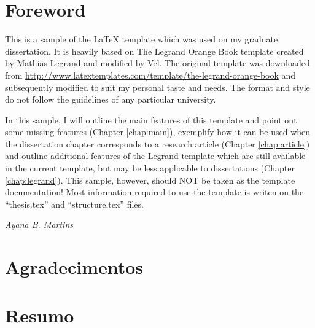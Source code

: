 \documentclass[11pt, %
               oneside] %
               {book}
\begin{document}
\chapter*{Foreword}
\thispagestyle{plain}

This is a sample of the LaTeX template which was used on my graduate dissertation. It is
heavily based on The Legrand Orange Book template created by Mathias Legrand and 
modified by Vel. The original template was downloaded from 
\url{http://www.latextemplates.com/template/the-legrand-orange-book} and subsequently modified
to suit my personal taste and needs. The format and style do not follow the guidelines of any
particular university.

In this sample, I will outline the main features of this template and
point out some missing features (Chapter \ref{chap:main}), exemplify how it can be used when
the dissertation chapter corresponds to a research article (Chapter \ref{chap:article}) and 
outline additional features
of the Legrand template which are still available in the current template, but may be less
applicable to dissertations (Chapter \ref{chap:legrand}). This sample, however, should
NOT be taken as the template documentation! Most information required to use the template
is writen on the ``thesis.tex'' and ``structure.tex'' files.

\vspace{1.5cm}
\begin{flushright}
 \textit{Ayana B. Martins}
\end{flushright}




\chapter*{Agradecimentos}
\thispagestyle{plain}

\lipsum[1-3]


\chapter*{Resumo}
\thispagestyle{plain}
\end{document}
